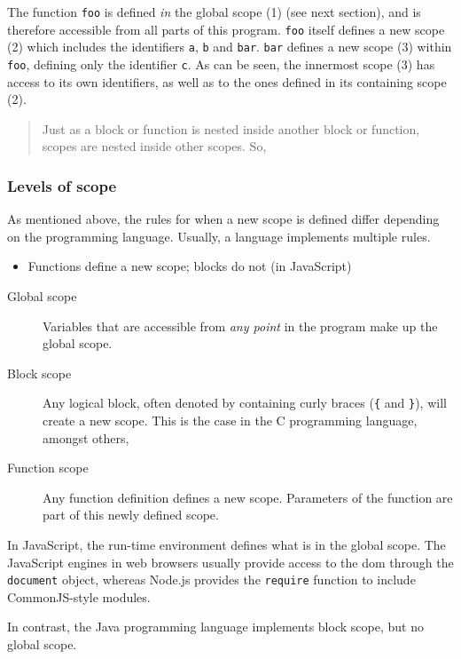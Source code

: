 The function \texttt{foo} is defined \emph{in} the global scope (1) (see
next section), and is therefore accessible from all parts of this
program. \texttt{foo} itself defines a new scope (2) which includes the
identifiers \texttt{a}, \texttt{b} and \texttt{bar}. \texttt{bar}
defines a new scope (3) within \texttt{foo}, defining only the
identifier \texttt{c}. As can be seen, the innermost scope (3) has
access to its own identifiers, as well as to the ones defined in its
containing scope (2).

\begin{quote}
Just as a block or function is nested inside another block or function,
scopes are nested inside other scopes. So,
\end{quote}

\subsubsection{Levels of scope}\label{levels-of-scope}

As mentioned above, the rules for when a new scope is defined differ
depending on the programming language. Usually, a language implements
multiple rules.

\begin{itemize}
\itemsep1pt\parskip0pt
\item
  Functions define a new scope; blocks do not (in JavaScript)
\end{itemize}

\begin{description}
\item[Global scope]
Variables that are accessible from \emph{any point} in the program make
up the global scope.
\item[Block scope]
Any logical block, often denoted by containing curly braces (\texttt{\{}
and \texttt{\}}), will create a new scope. This is the case in the C
programming language, amongst others,
\item[Function scope]
Any function definition defines a new scope. Parameters of the function
are part of this newly defined scope.
\end{description}

In JavaScript, the run-time environment defines what is in the global
scope. The JavaScript engines in web browsers usually provide access to
the \ac{dom} through the \texttt{document} object, whereas Node.js
provides the \texttt{require} function to include CommonJS-style
modules.

In contrast, the Java programming language implements block scope, but
no global scope.

